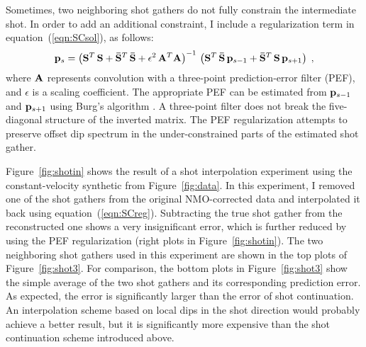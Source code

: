   Sometimes, two neighboring shot gathers do not fully constrain the
  intermediate shot. In order to add an additional constraint, I
  include a regularization term in equation~(\ref{eqn:SCsol}), as
  follows:
  \begin{equation}
    \label{eqn:SCreg}
    \bold{p}_s = \left(
      \bold{S}^T\,\bold{S} +
      \bold{\bar{S}}^T\,\bold{\bar{S}} + 
        \epsilon^2\,\bold{A}^T\bold{A}
    \right)^{-1}\,
    \left(\bold{S}^T\,\bold{\bar{S}}\,\bold{p}_{s-1} +
      \bold{\bar{S}}^T\,\bold{S}\,\bold{p}_{s+1}\right)\;,
  \end{equation}
  where $\bold{A}$ represents convolution with a three-point
  prediction-error filter (PEF), and $\epsilon$ is a scaling
  coefficient. The appropriate PEF can be estimated from
  $\bold{p}_{s-1}$ and $\bold{p}_{s+1}$ using Burg's algorithm
  \cite{GEO37.02.03750376,Burg.sepphd.6,Claerbout.fgdp.76}. A
  three-point filter does not break the five-diagonal structure
  of the inverted matrix.  The PEF regularization attempts to preserve
  offset dip spectrum in the under-constrained parts of the estimated
  shot gather.
  
  Figure~\ref{fig:shotin} shows the result of a shot interpolation
  experiment using the constant-velocity synthetic from
  Figure~\ref{fig:data}. In this experiment, I removed one of the
  shot gathers from the original NMO-corrected data and interpolated
  it back using equation~(\ref{eqn:SCreg}). Subtracting the true shot
  gather from the reconstructed one shows a very insignificant error,
  which is further reduced by using the PEF regularization (right
  plots in Figure~\ref{fig:shotin}).  The two neighboring shot gathers
  used in this experiment are shown in the top plots of
  Figure~\ref{fig:shot3}.  For comparison, the bottom plots in
  Figure~\ref{fig:shot3} show the simple average of the two shot
  gathers and its corresponding prediction error. As expected, the
  error is significantly larger than the error of shot
  continuation. An interpolation scheme based on local dips in the
  shot direction would probably achieve a better result, but it is
  significantly more expensive than the shot continuation scheme
  introduced above.
  
 
